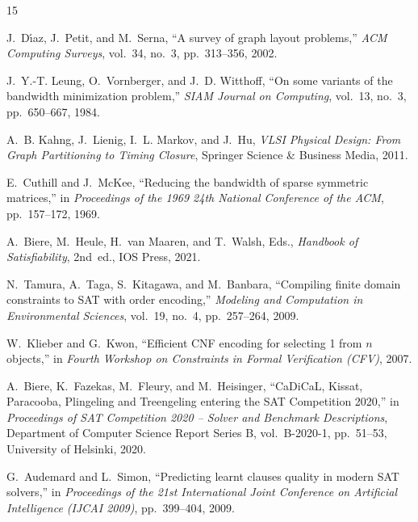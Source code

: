 \documentclass[a4paper,fleqn]{cas-sc}
\begin{document}

\begin{thebibliography}{15}

J.~D\'{\i}az, J.~Petit, and M.~Serna, ``A survey of graph layout problems,'' \emph{ACM Computing Surveys}, vol.~34, no.~3, pp.~313--356, 2002.

J.~Y.-T. Leung, O.~Vornberger, and J.~D. Witthoff, ``On some variants of the bandwidth minimization problem,'' \emph{SIAM Journal on Computing}, vol.~13, no.~3, pp.~650--667, 1984.

A.~B. Kahng, J.~Lienig, I.~L. Markov, and J.~Hu, \emph{VLSI Physical Design: From Graph Partitioning to Timing Closure}, Springer Science \& Business Media, 2011.

E.~Cuthill and J.~McKee, ``Reducing the bandwidth of sparse symmetric matrices,'' in \emph{Proceedings of the 1969 24th National Conference of the ACM}, pp.~157--172, 1969.

A.~Biere, M.~Heule, H.~van Maaren, and T.~Walsh, Eds., \emph{Handbook of Satisfiability}, 2nd~ed., IOS Press, 2021.

N.~Tamura, A.~Taga, S.~Kitagawa, and M.~Banbara, ``Compiling finite domain constraints to SAT with order encoding,'' \emph{Modeling and Computation in Environmental Sciences}, vol.~19, no.~4, pp.~257--264, 2009.

W.~Klieber and G.~Kwon, ``Efficient CNF encoding for selecting 1 from $n$ objects,'' in \emph{Fourth Workshop on Constraints in Formal Verification (CFV)}, 2007.

A.~Biere, K.~Fazekas, M.~Fleury, and M.~Heisinger, ``CaDiCaL, Kissat, Paracooba, Plingeling and Treengeling entering the SAT Competition 2020,'' in \emph{Proceedings of SAT Competition 2020 -- Solver and Benchmark Descriptions}, Department of Computer Science Report Series B, vol.~B-2020-1, pp.~51--53, University of Helsinki, 2020.

G.~Audemard and L.~Simon, ``Predicting learnt clauses quality in modern SAT solvers,'' in \emph{Proceedings of the 21st International Joint Conference on Artificial Intelligence (IJCAI 2009)}, pp.~399--404, 2009.


\end{thebibliography}
\end{document}

